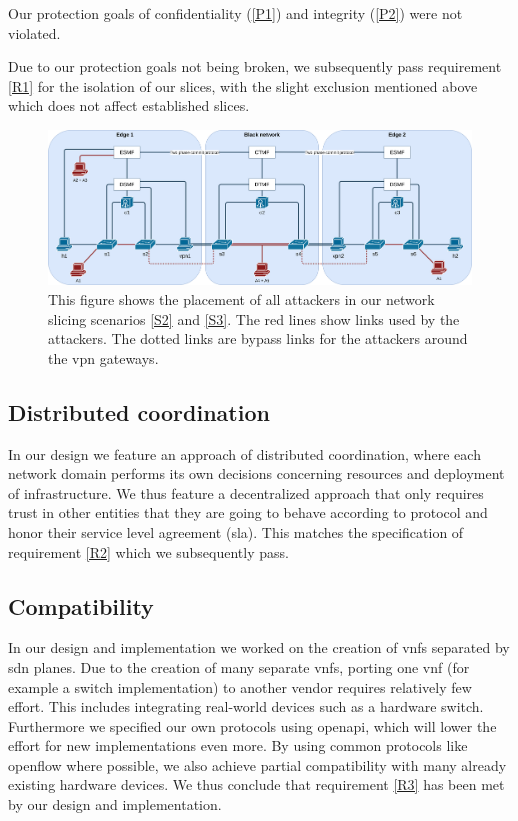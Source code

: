 Our protection goals of confidentiality (\ref{P1}) and integrity (\ref{P2}) were not violated.

Due to our protection goals not being broken, we subsequently pass requirement \ref{R1} for the isolation of our slices, with the slight exclusion mentioned above which does not affect established slices.

\begin{landscape}
    \begin{figure}[ht]
        \centering
        \includegraphics[width=\linewidth]{images/chapter_7/attackers_topo.png}
        \caption[Placement of attackers in scenario S2 and S3]{This figure shows the placement of all attackers in our network slicing scenarios \ref{S2} and \ref{S3}. The red lines show links used by the attackers. The dotted links are bypass links for the attackers around the \acrshort{vpn} gateways.}
        \label{fig:attackers_topo}
    \end{figure}
\end{landscape}

\subsection{Distributed coordination}
In our design we feature an approach of distributed coordination, where each network domain performs its own decisions concerning resources and deployment of infrastructure. We thus feature a decentralized approach that only requires trust in other entities that they are going to behave according to protocol and honor their service level agreement (\acrshort{sla}). This matches the specification of requirement \ref{R2} which we subsequently pass.

\subsection{Compatibility}
In our design and implementation we worked on the creation of \acrshort{vnf}s separated by \acrshort{sdn} planes. Due to the creation of many separate \acrshort{vnf}s, porting one \acrshort{vnf} (for example a switch implementation) to another vendor requires relatively few effort. This includes integrating real-world devices such as a hardware switch. Furthermore we specified our own protocols using \Gls{openapi}, which will lower the effort for new implementations even more. By using common protocols like \Gls{openflow} where possible, we also achieve partial compatibility with many already existing hardware devices. We thus conclude that requirement \ref{R3} has been met by our design and implementation.

